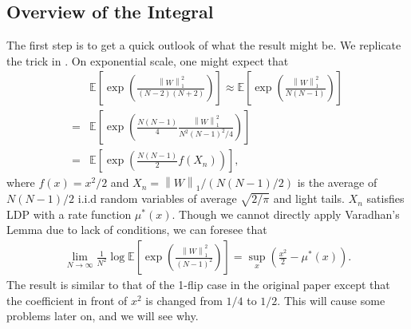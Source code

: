 \documentclass[10pt]{article}
\newcommand{\e}{\mathbb{E}}
\newcommand{\norm}[1]{\left\lVert#1\right\rVert}
\newenvironment{Proof of lemma}{\noindent{\bf Proof of Lemma}}{\hfill$\Box$\newline}
\newenvironment{Proof of claim}{\noindent{\bf Proof of claim}}{\hfill$\Box$\newline}
\newenvironment{Proof of theorem}{\noindent{\bf Proof of Theorem}}{\hfill\scriptsize{$\Box$}\newline}
\newenvironment{Proof of theorems}{\noindent{\bf Proof of Theorems}}{\hfill$\Box$\newline}
\newenvironment{Proof of proposition}{\noindent{\bf Proof of Proposition}}{\hfill$\Box$\newline}
\newenvironment{Proof of propositions}{\noindent{\bf Proof of Propositions}}{\hfill$\Box$\newline}
\newenvironment{Proof of exercise}{\noindent{\it Proof of Exercise:}}{\hfill$\Box$}
\numberwithin{equation}{section}
\begin{document}
\subsection{Overview of the Integral} \label{2flip_overview}
The first step is to get a quick outlook of what the result might be. We replicate the trick in \cite{SK_optimal}. On exponential scale, one might expect that
\begin{align}
    &\e \left[ \exp \left(\frac{\norm{W}^2_1}{(N-2)(N+2)}\right)\right] \approx \e \left[ \exp \left(\frac{\norm{W}^2_1}{N(N-1)}\right) \right] \nonumber \\
    =& \e \left[ \exp \left(\frac{N(N-1)}{4}\frac{\norm{W}^2_1}{N^2(N-1)^2/4}\right)\right] \nonumber \\
    =& \e \left[ \exp \left(\frac{N(N-1)}{2} f(X_n)\right)\right],
\end{align}
where $f(x) = x^2/2$ and $X_n = \norm{W}_1/(N(N-1)/2)$ is the average of $N(N-1)/2$ i.i.d random variables of average $\sqrt{2/\pi}$ and light tails. $X_n$ satisfies LDP with a rate function $\mu^\ast(x)$. Though we cannot directly apply Varadhan's Lemma due to lack of conditions, we can foresee that
\begin{align}
    \lim_{N \to \infty} \frac{1}{N^2} \log \e \left[ \exp \left(\frac{\norm{W}^2_1}{(N-1)^2}\right) \right] = \sup_x \left(\frac{x^2}{2}-\mu^\ast(x)\right).
\end{align}
The result is similar to that of the 1-flip case in the original paper except that the coefficient in front of $x^2$ is changed from $1/4$ to $1/2$. This will cause some problems later on, and we will see why.
\end{document}
